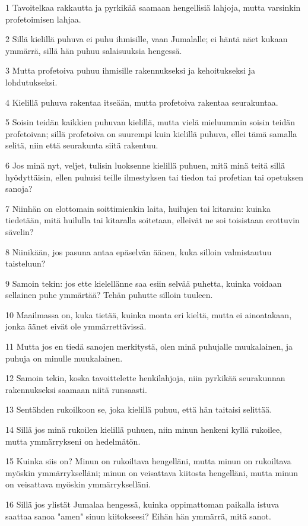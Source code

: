 \par 1 Tavoitelkaa rakkautta ja pyrkikää saamaan hengellisiä lahjoja, mutta varsinkin profetoimisen lahjaa.
\par 2 Sillä kielillä puhuva ei puhu ihmisille, vaan Jumalalle; ei häntä näet kukaan ymmärrä, sillä hän puhuu salaisuuksia hengessä.
\par 3 Mutta profetoiva puhuu ihmisille rakennukseksi ja kehoitukseksi ja lohdutukseksi.
\par 4 Kielillä puhuva rakentaa itseään, mutta profetoiva rakentaa seurakuntaa.
\par 5 Soisin teidän kaikkien puhuvan kielillä, mutta vielä mieluummin soisin teidän profetoivan; sillä profetoiva on suurempi kuin kielillä puhuva, ellei tämä samalla selitä, niin että seurakunta siitä rakentuu.
\par 6 Jos minä nyt, veljet, tulisin luoksenne kielillä puhuen, mitä minä teitä sillä hyödyttäisin, ellen puhuisi teille ilmestyksen tai tiedon tai profetian tai opetuksen sanoja?
\par 7 Niinhän on elottomain soittimienkin laita, huilujen tai kitarain: kuinka tiedetään, mitä huilulla tai kitaralla soitetaan, elleivät ne soi toisistaan erottuvin sävelin?
\par 8 Niinikään, jos pasuna antaa epäselvän äänen, kuka silloin valmistautuu taisteluun?
\par 9 Samoin tekin: jos ette kielellänne saa esiin selvää puhetta, kuinka voidaan sellainen puhe ymmärtää? Tehän puhutte silloin tuuleen.
\par 10 Maailmassa on, kuka tietää, kuinka monta eri kieltä, mutta ei ainoatakaan, jonka äänet eivät ole ymmärrettävissä.
\par 11 Mutta jos en tiedä sanojen merkitystä, olen minä puhujalle muukalainen, ja puhuja on minulle muukalainen.
\par 12 Samoin tekin, koska tavoittelette henkilahjoja, niin pyrkikää seurakunnan rakennukseksi saamaan niitä runsaasti.
\par 13 Sentähden rukoilkoon se, joka kielillä puhuu, että hän taitaisi selittää.
\par 14 Sillä jos minä rukoilen kielillä puhuen, niin minun henkeni kyllä rukoilee, mutta ymmärrykseni on hedelmätön.
\par 15 Kuinka siis on? Minun on rukoiltava hengelläni, mutta minun on rukoiltava myöskin ymmärrykselläni; minun on veisattava kiitosta hengelläni, mutta minun on veisattava myöskin ymmärrykselläni.
\par 16 Sillä jos ylistät Jumalaa hengessä, kuinka oppimattoman paikalla istuva saattaa sanoa "amen" sinun kiitokseesi? Eihän hän ymmärrä, mitä sanot.
